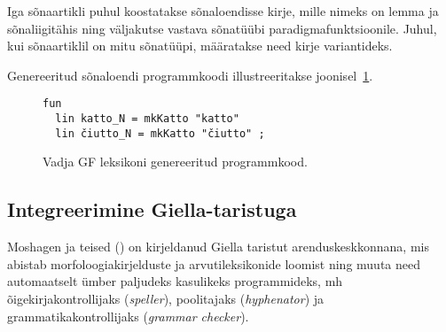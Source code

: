 \documentclass[12pt,a4paper]{article}
\begin{document}
Iga sõnaartikli puhul koostatakse sõnaloendisse kirje, mille nimeks on lemma ja sõnaliigi\-tähis ning väljakutse vastava sõnatüübi paradigma\-funktsioonile. Juhul, kui sõna\-artiklil on mitu sõnatüüpi, määratakse need kirje variantideks.


Genereeritud sõnaloendi programm\-koodi illustreeritakse joonisel~\ref{code:gf-lexicon}. %

\begin{figure}[ht]
  \center
  \begin{verbatim}
fun
  lin katto_N = mkKatto "katto"
  lin čiutto_N = mkKatto "čiutto" ;
\end{verbatim}
\caption{Vadja GF leksikoni genereeritud programmkood.
  \label{code:gf-lexicon}}
\end{figure}








\subsection{Integreerimine Giella-taristuga}
\label{sec:giella}
% 


Moshagen ja teised (\citeyear[344]{moshagen_building_2013}) on kirjeldanud Giella taristut arendus\-keskkonnana, mis abistab morfoloogia\-kirjelduste ja arvuti\-leksikonide loomist ning muuta need automaatselt ümber paljudeks kasulikeks programmideks, mh õige\-kirja\-kontrollijaks (\textit{speller}), poolitajaks (\textit{hyphenator}) ja grammatika\-kontrollijaks (\textit{grammar checker}). 
\end{document}
